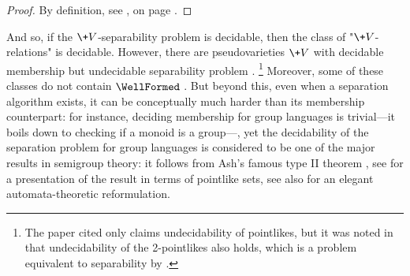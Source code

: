 \begin{proof}
	By definition, see , on page \pageref{fig:projection}.
\end{proof}

And so, if the $\+V$-separability problem is decidable, then the class of "$\+V$-relations"
is decidable. However, there are pseudovarieties $\+V$ with decidable membership but 
undecidable separability problem \cite[Corollary 1.6, p.~478]{Rhode2011Pointlike}.%
\footnote{\AP\label{footnote:undecidability-separation}The paper cited only claims undecidability of pointlikes, but it was noted in \cite[\S~1, pp.~1--2]{Gool2019Pointlike} that undecidability of the 2-pointlikes also holds, which is a problem 
equivalent to separability by \cite[Proposition 3.4, p.~6]{Almeida1999Algorithmic}.}
Moreover, some of these classes do not contain $\WellFormed$ \cite[Corollary 1.7, p.~478]{Rhode2011Pointlike}. But beyond 
this, even when a separation algorithm exists, it can be conceptually much harder than its
membership counterpart: for instance, deciding membership for group languages is trivial---it boils down to checking if a monoid is a group---, yet the decidability of the 
separation problem for group languages is considered to be one of the major results in semigroup theory:
it follows from Ash's famous type II theorem \cite[Theorem 2.1, p.~129]{Ash1991Inevitable}, see \cite[Theorem 1.1, p.~3]{Henckell1991Ash} for a presentation of the result in terms of pointlike sets, see also \cite[\S~III, Theorem 8, p.~5]{PlaceZeitoun2023Group} for an elegant automata-theoretic reformulation.

